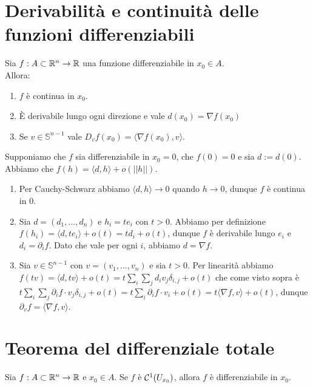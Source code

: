 \documentclass[openany]{book}
\begin{document}
\section{Derivabilità e continuità delle funzioni differenziabili}

\begin{theorem}{}{}
    Sia $f:A\subset \mathbb{R}^n \to \mathbb{R}$ una funzione differenziabile in $x_0 \in A$.\\
    Allora:\begin{enumerate}
        \item $f$ è continua in $x_0$.
        \item È derivabile lungo ogni direzione e vale $d(x_0) = \nabla f(x_0) $
        \item Se $v \in \mathbb{S}^{n-1}$ vale $D_v f(x_0) = \langle \nabla f(x_0), v\rangle$.
    \end{enumerate}
\end{theorem}

    Supponiamo che $f$ sia differenziabile in $x_0=0$, che $f(0)=0$ e sia $d := d(0)$. Abbiamo che $f(h)= \langle d, h\rangle + o(||h||)$. \begin{enumerate}
        \item Per Cauchy-Schwarz abbiamo $\langle d, h\rangle\to 0$ quando $h\to 0$, dunque $f$ è continua in $0$.
        \item  Sia $d = (d_1,...,d_n)$ e $h_i = te_i$ con $t> 0$. Abbiamo per definizione $f(h_i)= \langle d, te_i\rangle + o(t) = td_i + o(t)$, dunque $f$ è derivabile lungo $e_i$ e $d_i = \partial_i f$. Dato che vale per ogni $i$, abbiamo $d = \nabla f$.
        \item Sia $v\in \mathbb{S}^{n-1}$ con $v = (v_1,...,v_n)$ e sia $t>0$. Per linearità abbiamo $f(tv) = \langle d,tv\rangle + o(t) = t\sum_i \sum_j d_i v_j \delta_{i,j} + o(t)$ che come visto sopra è $t\sum_i\sum_j\partial_i f \cdot v_j \delta_{i,j} + o(t) = t\sum_i \partial_i f \cdot v_i + o(t)= t\langle\nabla f, v \rangle + o(t)$, dunque $\partial_v f = \langle\nabla f, v \rangle$. 
    \end{enumerate}


\section{Teorema del differenziale totale}

\begin{theorem}{}{}
    Sia $f: A \subset \mathbb{R}^n \to \mathbb{R}$ e $x_0 \in A$. Se $f$ è $\mathcal{C}^1(U_{x_0})$, allora $f$ è differenziabile in $x_0$.
\end{theorem}
\end{document}

